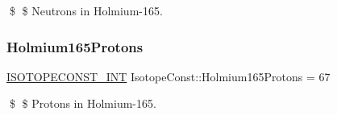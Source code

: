 \$ \$ Neutrons in Holmium-\/165. \mbox{\label{group___isotope_const-_holmium-_ho165_gabfadb2c4aa0fa4a3b2e9cf2de91b7108}} 
\subsubsection{\texorpdfstring{Holmium165\+Protons}{Holmium165Protons}}
{\footnotesize\ttfamily \mbox{\hyperlink{group___isotope_const-_macros_ga5f18360b3e99483a35c32d789e62621c}{I\+S\+O\+T\+O\+P\+E\+C\+O\+N\+S\+T\+\_\+\+I\+NT}} Isotope\+Const\+::\+Holmium165\+Protons = 67}

\$ \$ Protons in Holmium-\/165. 